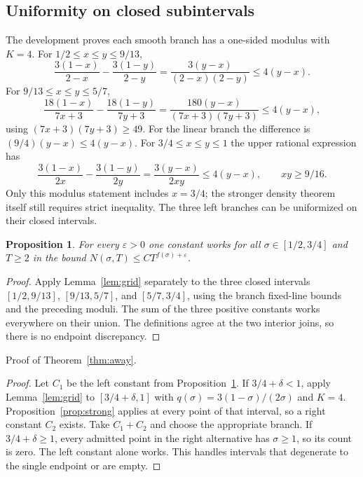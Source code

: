 \documentclass[11pt,a4paper,oneside]{article}
\newtheorem{proposition}[theorem]{Proposition}
\theoremstyle{definition}
\newcommand{\eps}{\varepsilon}
\numberwithin{equation}{section}
\begin{document}
\subsection{Uniformity on closed subintervals}
The development proves each smooth branch has a one-sided modulus with $K=4$.
For $1/2\le x\le y\le9/13$,
\[
 \frac{3(1-x)}{2-x}-\frac{3(1-y)}{2-y}
       =\frac{3(y-x)}{(2-x)(2-y)}\le4(y-x).
\]
For $9/13\le x\le y\le5/7$,
\[
 \frac{18(1-x)}{7x+3}-\frac{18(1-y)}{7y+3}
       =\frac{180(y-x)}{(7x+3)(7y+3)}\le4(y-x),
\]
using $(7x+3)(7y+3)\ge49$.
For the linear branch the difference is $(9/4)(y-x)\le4(y-x)$.
For $3/4\le x\le y\le1$ the upper rational expression has
\[
 \frac{3(1-x)}{2x}-\frac{3(1-y)}{2y}
       =\frac{3(y-x)}{2xy}\le4(y-x),\qquad xy\ge9/16.
\]
Only this modulus statement includes $x=3/4$; the stronger density theorem
itself still requires strict inequality.
The three left branches can be uniformized on their closed intervals.
\begin{proposition}\label{prop:leftuniform}
For every $\eps>0$ one constant works for all $\sigma\in[1/2,3/4]$
and $T\ge2$ in the bound $N(\sigma,T)\le CT^{f(\sigma)+\eps}$.
\end{proposition}
\begin{proof}
Apply Lemma~\ref{lem:grid} separately to the three closed intervals
$[1/2,9/13]$, $[9/13,5/7]$, and $[5/7,3/4]$, using the branch
fixed-line bounds and the preceding moduli. The sum of the three positive
constants works everywhere on their union. The definitions agree at the
two interior joins, so there is no endpoint discrepancy.
\end{proof}
Proof of Theorem~\ref{thm:away}.
\begin{proof}
Let $C_1$ be the left constant from Proposition~\ref{prop:leftuniform}.
If $3/4+\delta<1$, apply Lemma~\ref{lem:grid} to
$[3/4+\delta,1]$ with $q(\sigma)=3(1-\sigma)/(2\sigma)$ and $K=4$.
Proposition~\ref{prop:strong} applies at every point of that interval,
so a right constant $C_2$ exists. Take $C_1+C_2$ and choose the appropriate
branch. If $3/4+\delta\ge1$, every admitted point in the right alternative
has $\sigma\ge1$, so its count is zero. The left constant alone works.
This handles intervals that degenerate to the single endpoint or are empty.
\end{proof}
\end{document}
